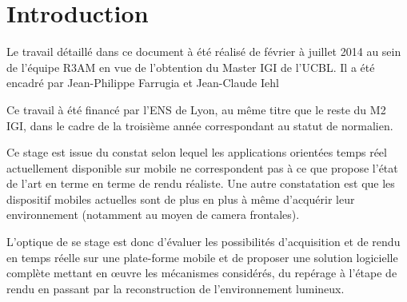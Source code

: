 \documentclass[10pt,a4paper,twoside, twocolumn]{report}
\newcommand*{\rootPath}{../}
\begin{document}
{}
\chapter*{Introduction}

Le travail détaillé dans ce document à été réalisé de février à juillet 2014 au sein de l'équipe R3AM en vue de l’obtention du Master IGI de l'UCBL. Il a été encadré par Jean-Philippe Farrugia et Jean-Claude Iehl

Ce travail à été financé par l'ENS de Lyon, au même titre que le reste du M2 IGI, dans le cadre de la troisième année correspondant au statut de normalien.

Ce stage est issue du constat selon lequel les applications orientées temps réel actuellement disponible sur mobile ne correspondent pas à ce que propose l'état de l'art en terme en terme de rendu réaliste. Une autre constatation est que les dispositif mobiles actuelles sont de plus en plus à même d’acquérir leur environnement (notamment au moyen de camera frontales).

L'optique de se stage est donc d'évaluer les possibilités d'acquisition et de rendu en temps réelle sur une plate-forme mobile et de proposer une solution logicielle complète mettant en œuvre les mécanismes considérés, du repérage à l'étape de rendu en passant par la reconstruction de l'environnement lumineux.

\ifstandalone
	
	
\fi
\end{document}
